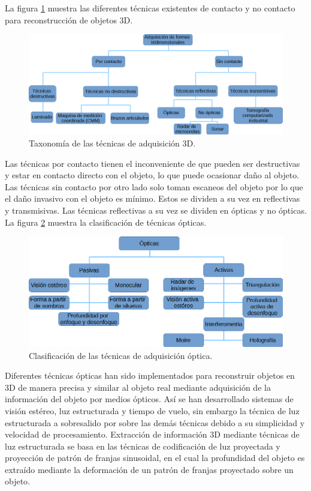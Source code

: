 \documentclass[10pt,letterpaper]{article}
\begin{document}
La figura \ref{tif34} muestra las diferentes técnicas existentes de contacto y no contacto para reconstrucción de objetos 3D.

\begin{figure}[H]
	\centering
    \includegraphics[width=1\textwidth]{tifs/tif34.png}
    \caption{Taxonomía de las técnicas de adquisición 3D\cite{Rocc:Cign}.}
    \label{tif34}
\end{figure}

Las técnicas por contacto tienen el inconveniente de que pueden ser destructivas y estar en contacto directo con el objeto, lo que puede ocasionar daño al objeto. Las técnicas sin contacto por otro lado solo toman escaneos del objeto por lo que el daño invasivo con el objeto es mínimo. Estos se dividen a su vez en reflectivas y transmisivas. Las técnicas reflectivas a su vez se dividen en ópticas y no ópticas. La figura \ref{tif35} muestra la clasificación de técnicas ópticas. 

\begin{figure}[H]
	\centering
    \includegraphics[width=1\textwidth]{tifs/tif35.png}
    \caption{Clasificación de las técnicas de adquisición óptica\cite{Rocc:Cign}.}
    \label{tif35}
\end{figure}

Diferentes técnicas ópticas han sido implementados para reconstruir objetos en 3D de manera precisa y similar al objeto real mediante adquisición de la información del objeto por medios ópticos. Así se han desarrollado sistemas de visión estéreo, luz estructurada y tiempo de vuelo, sin embargo la técnica de luz estructurada a sobresalido por sobre las demás técnicas debido a su simplicidad y velocidad de procesamiento\cite{Ou:Li}. Extracción de información 3D mediante técnicas de luz estructurada se basa en las técnicas de codificación de luz proyectada y proyección de patrón de franjas sinusoidal, en el cual la profundidad del objeto es extraído mediante la deformación de un patrón de franjas proyectado sobre un objeto\cite{Yosh:}. %
\end{document}
